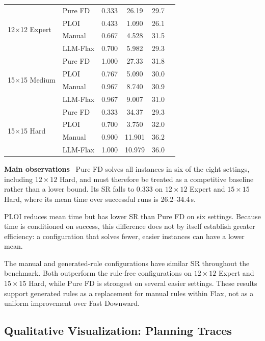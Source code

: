 \documentclass{ieeeaccess}
\newcommand{\myparagraph}[1]{\noindent\textbf{#1}~}
\newcommand{\method}{LLM-Flax\xspace}
\begin{document}
\begin{table}[t]
{\begin{tabular}{llcccc}
    \midrule
    \multirow{4}{*}{12$\times$12 Expert}
      & Pure FD      & 0.333 & 26.19 & 29.7 \\
      & PLOI         & 0.433 & 1.090 & 26.1 \\
      & Manual       & 0.667 & 4.528 & 31.5 \\
      & \method      & 0.700 & 5.982 & 29.3 \\
    \midrule
    \multirow{4}{*}{15$\times$15 Medium}
      & Pure FD      & 1.000 & 27.33 & 31.8 \\
      & PLOI         & 0.767 & 5.090 & 30.0 \\
      & Manual       & 0.967 & 8.740 & 30.9 \\
      & \method      & 0.967 & 9.007 & 31.0 \\
    \midrule
    \multirow{4}{*}{15$\times$15 Hard}
      & Pure FD      & 0.333 & 34.37 & 29.3 \\
      & PLOI         & 0.700 & 3.750 & 32.0 \\
      & Manual       & 0.900 & 11.901 & 36.2 \\
      & \method      & 1.000 & 10.979 & 36.0 \\
    \bottomrule
  \end{tabular}%
  }
\end{table}

\myparagraph{Main observations}
Pure FD solves all instances in six of the eight settings, including $12{\times}12$ Hard, and must therefore be treated as a competitive baseline rather than a lower bound. Its SR falls to 0.333 on $12{\times}12$ Expert and $15{\times}15$ Hard, where its mean time over successful runs is 26.2--34.4\,s.

PLOI reduces mean time but has lower SR than Pure FD on six settings. Because time is conditioned on success, this difference does not by itself establish greater efficiency: a configuration that solves fewer, easier instances can have a lower mean.

The manual and generated-rule configurations have similar SR throughout the benchmark. Both outperform the rule-free configurations on $12{\times}12$ Expert and $15{\times}15$ Hard, while Pure FD is strongest on several easier settings. These results support generated rules as a replacement for manual rules within Flax, not as a uniform improvement over Fast Downward.


\subsection{Qualitative Visualization: Planning Traces}
\label{app:vis}
\end{document}
